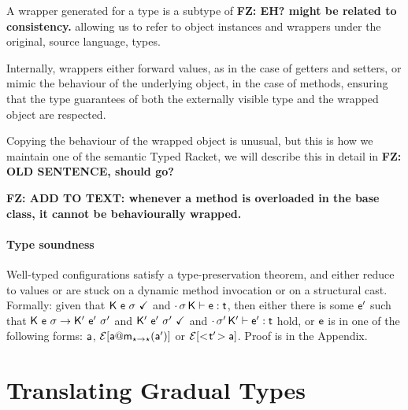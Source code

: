 \documentclass[acmlarge, anonymous, authordraft]{acmart}
\newcommand{\FZ}[1]{\textbf{FZ: #1}}
\begin{document}
% 




A wrapper generated for a type \C is a subtype of \C \FZ{EH?  might be related to consistency.} allowing us to refer to
object instances and wrappers under the original, source language,
types. 

Internally, wrappers either forward values, as in the case of getters
and setters, or mimic the behaviour of the underlying object, in the case of
methods, ensuring that the type guarantees of both the externally visible
type and the wrapped object are respected.






Copying the behaviour of the wrapped object is unusual, but this is how we
maintain one of the semantic Typed Racket, we will describe this in detail in \FZ{OLD SENTENCE, should go?}
%

\FZ{ADD TO TEXT: whenever a method is overloaded in the base class, it cannot be behaviourally wrapped.  }



\paragraph{Type soundness} Well-typed \kafka configurations satisfy a type-preservation theorem, and either reduce to values or are stuck on a dynamic method invocation or on a structural cast.  Formally:
given that ${\sf{K}}~{\sf{e}}~\sigma~\checkmark$ and $\EnvType\cdot\s\K\e\t$, then either there is some ${{{\sf{e'}}}}$ 
such that ${{\sf{K}}}~{{\sf{e}}}~{\sigma} \rightarrow {{\ensuremath{{\sf{K'}}}}}~{{{{\sf{e'}}}}}~{{{\sigma'}}}$ and ${{\sf{K'}}}~{{{\sf{e'}}}}~{{\sigma'}}~\checkmark$ and $\EnvType\cdot\sp\Kp\ep\t$ hold, 
or ${\sf{e}}$ is in one of the following forms:
${\sf{a}}$, $\EE[\DynCall\a\m{\ap}]$ or $\EE[\SubCast\tp\a]$.  Proof is in the Appendix.







\section{Translating Gradual Types}
\end{document}
